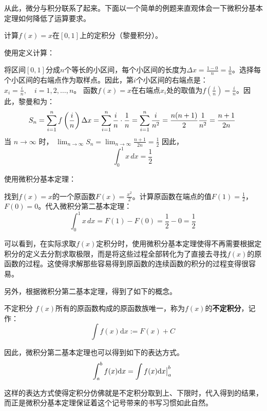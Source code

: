 
从此，微分与积分联系了起来。下面以一个简单的例题来直观体会一下微积分基本定理如何降低了运算要求。

\begin{example}{}
计算$f(x)=x$在$[0,1]$上的定积分（黎曼积分）。
\end{example}

使用定义计算：

将区间$[0, 1]$分成$n$个等长的小区间，每个小区间的长度为$\Delta x = \frac{1 - 0}{n} = \frac{1}{n}$。选择每个小区间的右端点作为取样点。因此，第$i$个小区间的右端点是：$x_i = \frac{i}{n}, \quad i = 1, 2, \ldots, n$。
函数$f(x) = x$在右端点$x_i$处的取值为$f\left(\frac{i}{n} \right)=\frac{i}{n}$。因此，黎曼和为：
$$S_n = \sum_{i=1}^n f\left( \frac{i}{n} \right) \Delta x = \sum_{i=1}^n \frac{i}{n} \cdot \frac{1}{n} = \sum_{i=1}^n \frac{i}{n^2}=\frac{n(n+1)}{2}{1\over n^2} = \frac{n+1}{2n}~$$
当 $ n \to \infty $ 时，
$\lim_{n \to \infty} S_n = \lim_{n \to \infty} \frac{n+1}{2n}= \frac{1}{2}$
因此，$$\int_0^1 x \, dx = \frac{1}{2}~$$

使用微积分基本定理：

找到$f(x) = x$的一个原函数$F(x)=\frac{x^2}{2}$。计算原函数在端点的值$F(1) =\frac{1}{2}$，$F(0) = 0$。代入微积分第二基本定理：
$$\int_0^1 x \, dx = F(1) - F(0) = \frac{1}{2} - 0 = \frac{1}{2}~$$

可以看到，在实际求取$f(x)$定积分时，使用微积分基本定理使得不再需要根据定积分的定义去分割求取极限，而是将这些过程全部转化为了直接去寻找$f(x)$的原函数的过程。这使得求解那些容易得到原函数的连续函数的积分的过程变得很容易。

另外，根据微积分第二基本定理，得到了如下的概念。

\begin{definition}{不定积分}
$f(x)$所有的原函数构成的原函数族唯一，称为$f(x)$的\textbf{不定积分}，记作：
$$\int f(x)\mathrm {d}x:=F(x)+C~$$
\end{definition}

因此，微积分第二基本定理也可以得到如下的表达方式。
$$\int_{a}^{b} f(x)\mathrm {d}x=\int f(x)\mathrm {d}x\big{|}_{a}^{b}~$$

这样的表达方式使得定积分仿佛就是不定积分取到上、下限时，代入得到的结果，而正是微积分基本定理保证着这个记号带来的书写习惯如此自然。
